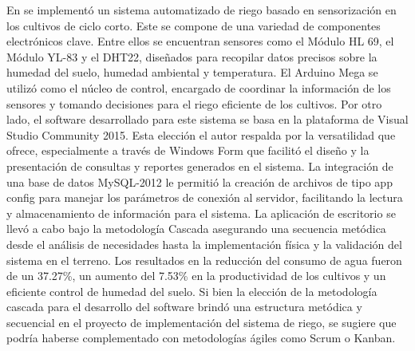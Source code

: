\bigbreak
En \cite{alcivar_dominguez_sistema_2018} se implementó un sistema automatizado de riego basado en sensorización en los cultivos de ciclo corto. Este se compone de una variedad de componentes electrónicos clave. Entre ellos se encuentran sensores como el Módulo HL 69, el Módulo YL-83 y el DHT22, diseñados para recopilar datos precisos sobre la humedad del suelo, humedad ambiental y temperatura. El Arduino Mega se utilizó como el núcleo de control, encargado de coordinar la información de los sensores y tomando decisiones para el riego eficiente de los cultivos. Por otro lado, el software desarrollado para este sistema se basa en la plataforma de Visual Studio Community 2015. Esta elección el autor respalda por la versatilidad que ofrece, especialmente a través de Windows Form que facilitó el diseño y la presentación de consultas y reportes generados en el sistema. La integración de una base de datos MySQL-2012 le permitió la creación de archivos de tipo app config para manejar los parámetros de conexión al servidor, facilitando la lectura y almacenamiento de información para el sistema. La aplicación de escritorio se llevó a cabo bajo la metodología Cascada asegurando una secuencia metódica desde el análisis de necesidades hasta la implementación física y la validación del sistema en el terreno. Los resultados en la reducción del consumo de agua fueron de un 37.27\%, un aumento del 7.53\% en la productividad de los cultivos y un eficiente control de humedad del suelo. Si bien la elección de la metodología cascada para el desarrollo del software brindó una estructura metódica y secuencial en el proyecto de implementación del sistema de riego, se sugiere que podría haberse complementado con metodologías ágiles como Scrum o Kanban.

